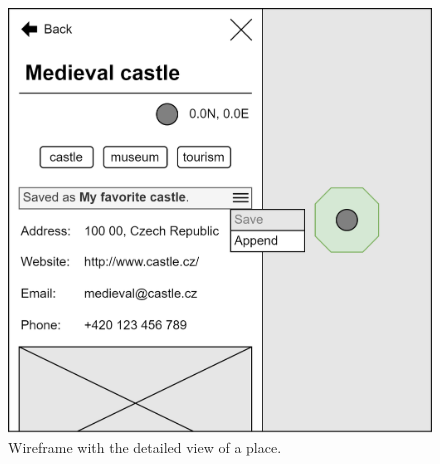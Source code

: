 \clearpage

\begin{figure}
\centering
\includegraphics[width=0.68\linewidth]{img/design/ui-detailed-view.png}
\caption{Wireframe with the detailed view of a place.}
\label{fig:ui-detailed-view}
\end{figure}

